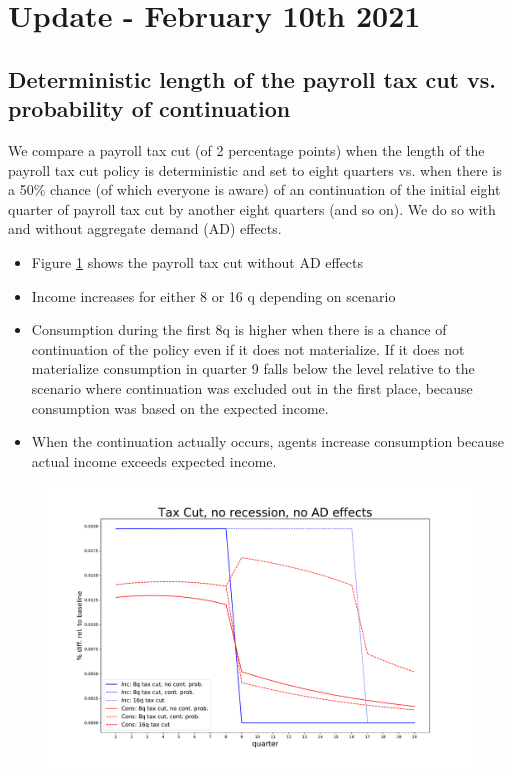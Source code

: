 \documentclass[]{article}
\begin{document}
\section{Update - February 10th 2021}	
	
\FloatBarrier	
\subsection{Deterministic length of the payroll tax cut vs. probability of continuation}

We compare a payroll tax cut (of 2 percentage points) when the length of the payroll tax cut policy is deterministic and set to eight quarters vs. when there is a 50\% chance (of which everyone is aware) of an continuation of the initial eight quarter of payroll tax cut by another eight quarters (and so on). We do so with and without aggregate demand (AD) effects.

\begin{itemize}
	\item Figure \ref{fig:taxcutnorecessionnoadeffects} shows the payroll tax cut without AD effects
	\item Income increases for either 8 or 16 q depending on scenario
	\item Consumption during the first 8q is higher when there is a chance of continuation of the policy even if it does not materialize. If it does not materialize consumption in quarter 9 falls below the level relative to the scenario where continuation was excluded out in the first place, because consumption was based on the expected income.
	\item When the continuation actually occurs, agents increase consumption because actual income exceeds expected income.
\end{itemize}

\begin{figure}
	\centering
	\includegraphics[width=\linewidth]{../ContinuationProb50/tax_cut_no_recession_no_AD_effects}
	\caption{}
	\label{fig:taxcutnorecessionnoadeffects}
\end{figure}
\end{document}
